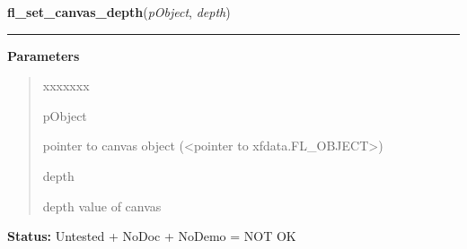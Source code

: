 \hspace{.8\funcindent}\begin{boxedminipage}{\funcwidth}

    \raggedright \textbf{fl\_set\_canvas\_depth}(\textit{pObject}, \textit{depth})

    \vspace{-1.5ex}

    \rule{\textwidth}{0.5\fboxrule}
\setlength{\parskip}{2ex}
\setlength{\parskip}{1ex}
      \textbf{Parameters}
      \vspace{-1ex}

      \begin{quote}
        \begin{Ventry}{xxxxxxx}

          \item[pObject]

          pointer to canvas object ({\textless}pointer to 
          xfdata.FL\_OBJECT{\textgreater})

          \item[depth]

          depth value of canvas

        \end{Ventry}

      \end{quote}

\textbf{Status:} Untested + NoDoc + NoDemo = NOT OK



    \end{boxedminipage}

    \label{xformslib:library:fl_set_canvas_attributes}

    \vspace{0.5ex}

